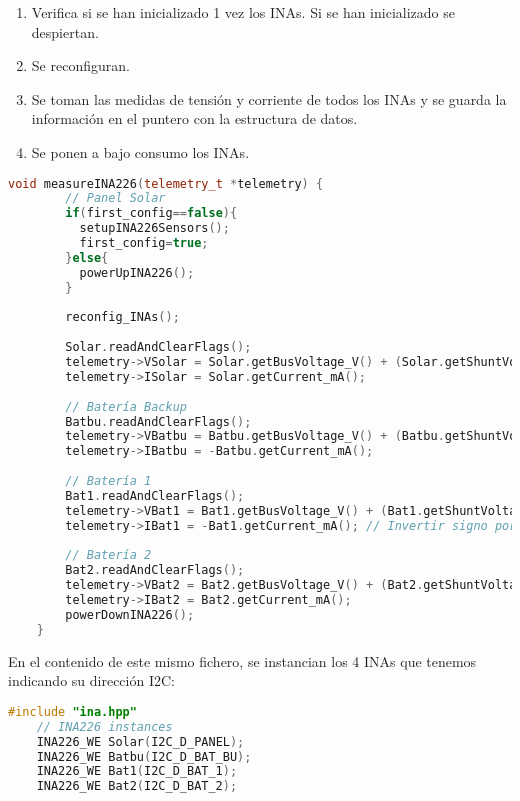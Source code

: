 \begin{enumerate}
    \item Verifica si se han inicializado 1 vez los INAs. Si se han inicializado se despiertan.
    \item Se reconfiguran.
    \item Se toman las medidas de tensión y corriente de todos los INAs y se guarda la información en el puntero con la estructura de datos.
    \item Se ponen a bajo consumo los INAs.
\end{enumerate}

\begin{lstlisting}[captionpos=b, caption={Codigo funcion measureINA226}, language=c++]
    void measureINA226(telemetry_t *telemetry) {
        // Panel Solar
        if(first_config==false){
          setupINA226Sensors();
          first_config=true;
        }else{
          powerUpINA226();  
        }
    
        reconfig_INAs();
        
        Solar.readAndClearFlags();
        telemetry->VSolar = Solar.getBusVoltage_V() + (Solar.getShuntVoltage_mV() / 100);
        telemetry->ISolar = Solar.getCurrent_mA();
    
        // Batería Backup
        Batbu.readAndClearFlags();
        telemetry->VBatbu = Batbu.getBusVoltage_V() + (Batbu.getShuntVoltage_mV() / 100);
        telemetry->IBatbu = -Batbu.getCurrent_mA();
    
        // Batería 1
        Bat1.readAndClearFlags();
        telemetry->VBat1 = Bat1.getBusVoltage_V() + (Bat1.getShuntVoltage_mV() / 100);
        telemetry->IBat1 = -Bat1.getCurrent_mA(); // Invertir signo porque está al revés
    
        // Batería 2
        Bat2.readAndClearFlags();
        telemetry->VBat2 = Bat2.getBusVoltage_V() + (Bat2.getShuntVoltage_mV() / 100);
        telemetry->IBat2 = Bat2.getCurrent_mA();
        powerDownINA226();
    }
\end{lstlisting}


En el contenido de este mismo fichero, se instancian los 4 INAs que tenemos indicando su dirección I2C:

\begin{lstlisting}[captionpos=b, caption={Instancia de las direcciones de los INAs.}, language=c++]
    #include "ina.hpp"
    // INA226 instances
    INA226_WE Solar(I2C_D_PANEL);
    INA226_WE Batbu(I2C_D_BAT_BU);
    INA226_WE Bat1(I2C_D_BAT_1);
    INA226_WE Bat2(I2C_D_BAT_2);
    
\end{lstlisting}

